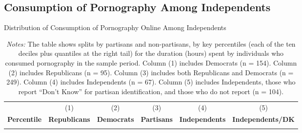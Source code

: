 \documentclass[12pt, letterpaper]{article}
\begin{document}
\subsection{Consumption of Pornography Among Independents}
\label{si:independents}
\begin{table}[ht] \centering \small \setlength\tabcolsep{6 pt}
	\caption{Distribution of Consumption of Pornography Online Among Independents}
	\label{tab:percentiles_duration_adultsites_by_individuals_independents_partisans}
	\begin{adjustbox}{max width=\textwidth}
		\begin{tabular}{@{\hspace{0\tabcolsep}}crrrrr@{\hspace{0\tabcolsep}}}
			\toprule		
			&\multicolumn{1}{c}{(1)}&\multicolumn{1}{c}{(2)}&\multicolumn{1}{c}{(3)}&\multicolumn{1}{c}{(4)}&\multicolumn{1}{c}{(5)}\\	
			\multicolumn{1}{l}{\textbf{Percentile}}&\multicolumn{1}{c}{\textbf{Republicans}}&\multicolumn{1}{c}{\textbf{Democrats}}&\multicolumn{1}{c}{\textbf{Partisans}}&\multicolumn{1}{c}{\textbf{Independents}}&\multicolumn{1}{r}{\textbf{Independents/DK}}\\
			\midrule
			\\
			\bottomrule
		\end{tabular}
	\end{adjustbox}
	\caption*{\footnotesize \emph{Notes:} 
		The table shows splits by partisans and non-partisans, by key percentiles (each of the ten deciles plus quantiles at the right tail) for the duration (hours) spent by individuals who consumed pornography in the sample period. 
		Column (1) includes Democrats (n = 154).
		Column (2) includes Republicans (n = 95).
		Column (3) includes both Republicans and Democrats (n = 249).
		Column (4) includes Independents (n = 67).
		Column (5) includes Independents, those who report ``Don't Know'' for partisan identification, and those who do not report (n = 104).
	}
\end{table}
\end{document}
